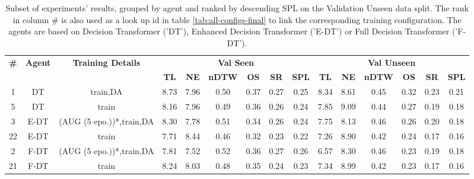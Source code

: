 \begin{table}
\centering
\caption{\label{tab:final}Subset of experiments' results, grouped by agent and ranked by descending SPL on the Validation Unseen data split. The rank in column \# is also used as a look up id in table \ref{tab:all-configs-final} to link the corresponding training configuration.     \newline The agents are based on Decision Transformer ('DT'), Enhanced Decision Transformer ('E-DT') or Full Decision Transformer ('F-DT').}
\begin{tabular}{@{\hskip3pt}c@{\hskip3pt}c@{\hskip3pt}c@{\hskip3pt}c@{\hskip3pt}c@{\hskip3pt}c@{\hskip3pt}c@{\hskip3pt}c@{\hskip3pt}c@{\hskip3pt}c@{\hskip3pt}c@{\hskip3pt}c@{\hskip3pt}c@{\hskip3pt}c@{\hskip3pt}c}
\toprule
\textbf{\#} & \textbf{Agent} & \textbf{Training Details} & \multicolumn{6}{c}{\textbf{Val Seen}} & \multicolumn{6}{c}{\textbf{Val Unseen}} \\
 \textbf{~} &     \textbf{~} &                \textbf{~} &       \textbf{TL} & \textbf{NE} & \textbf{nDTW} & \textbf{OS} & \textbf{SR} & \textbf{SPL} &         \textbf{TL} & \textbf{NE} & \textbf{nDTW} & \textbf{OS} & \textbf{SR} & \textbf{SPL} \\
\midrule
          1 &             DT &                  train,DA &              8.73 &        7.96 &          0.50 &        0.37 &        0.27 &         0.25 &                8.34 &        8.61 &          0.45 &        0.32 &        0.23 &         0.21 \\
          5 &             DT &                     train &              8.16 &        7.96 &          0.49 &        0.36 &        0.26 &         0.24 &                7.85 &        9.09 &          0.44 &        0.27 &        0.19 &         0.18 \\
          3 &           E-DT &  (AUG (5 epo.))*,train,DA &              8.30 &        7.78 &          0.51 &        0.34 &        0.26 &         0.24 &                7.75 &        8.13 &          0.46 &        0.26 &        0.20 &         0.18 \\
         22 &           E-DT &                     train &              7.71 &        8.44 &          0.46 &        0.32 &        0.23 &         0.22 &                7.26 &        8.90 &          0.42 &        0.24 &        0.17 &         0.16 \\
          2 &           F-DT &  (AUG (5 epo.))*,train,DA &              7.81 &        7.52 &          0.52 &        0.36 &        0.27 &         0.26 &                6.57 &        8.30 &          0.46 &        0.23 &        0.19 &         0.18 \\
         21 &           F-DT &                     train &              8.24 &        8.03 &          0.48 &        0.35 &        0.24 &         0.23 &                7.34 &        8.99 &          0.42 &        0.23 &        0.17 &         0.16 \\
\bottomrule
\end{tabular}
\end{table}
